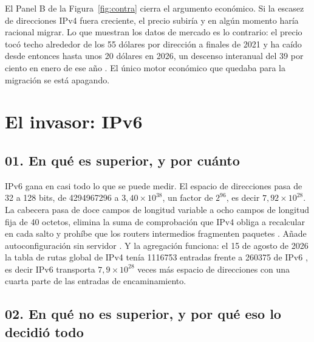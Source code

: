 \documentclass[11pt,letterpaper]{article}
\begin{document}
El Panel B de la Figura~\ref{fig:contra} cierra el argumento económico. Si la
escasez de direcciones IPv4 fuera creciente, el precio subiría y en algún momento
haría racional migrar. Lo que muestran los datos de mercado es lo contrario: el
precio tocó techo alrededor de los 55 dólares por dirección a finales de 2021 y
ha caído desde entonces hasta unos 20 dólares en 2026, un descenso interanual del
39 por ciento en enero de ese año \parencite{ipv4center2026}. El único motor
económico que quedaba para la migración se está apagando.

\section{El invasor: IPv6}

\subsection*{01. En qué es superior, y por cuánto}

IPv6 gana en casi todo lo que se puede medir. El espacio de direcciones pasa de
32 a 128 bits, de \num{4294967296} a $3{,}40\times10^{38}$, un factor de
$2^{96}$, es decir $7{,}92\times10^{28}$. La cabecera pasa de doce campos de
longitud variable a ocho campos de longitud fija de 40 octetos, elimina la suma
de comprobación que IPv4 obliga a recalcular en cada salto y prohíbe que los
routers intermedios fragmenten paquetes \parencite{rfc791,rfc8200}. Añade
autoconfiguración sin servidor \parencite{rfc4862}. Y la agregación funciona:
el 15 de agosto de 2026 la tabla de rutas global de IPv4 tenía \num{1116753}
entradas frente a \num{260375} de IPv6 \parencite{potaroo2026}, es decir IPv6
transporta $7{,}9\times10^{28}$ veces más espacio de direcciones con una cuarta parte de las
entradas de encaminamiento.

\subsection*{02. En qué no es superior, y por qué eso lo decidió todo}
\end{document}
